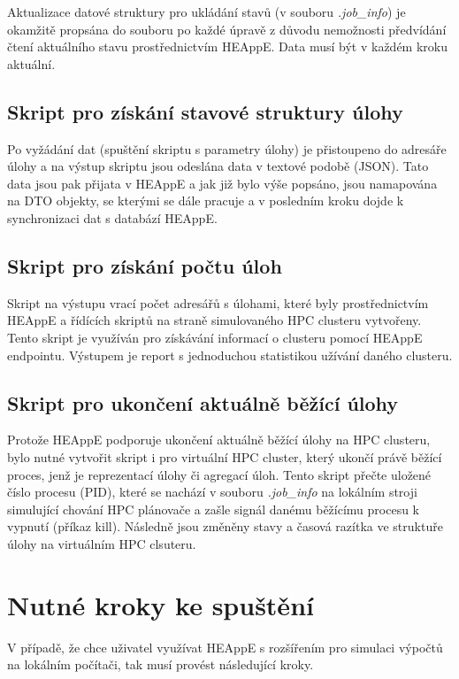 Aktualizace datové struktury pro ukládání stavů (v souboru \emph{.job\_info}) je okamžitě propsána do souboru po každé úpravě z důvodu nemožnosti předvídání čtení aktuálního stavu prostřednictvím HEAppE. Data musí být v každém kroku aktuální.

\subsection{Skript pro získání stavové struktury úlohy}
Po vyžádání dat (spuštění skriptu s parametry úlohy) je přistoupeno do adresáře úlohy a na výstup skriptu jsou odeslána data v textové podobě (JSON). Tato data jsou pak přijata v HEAppE a jak již bylo výše popsáno, jsou namapována na DTO objekty, se kterými se dále pracuje a v posledním kroku dojde k synchronizaci dat s databází HEAppE.

\subsection{Skript pro získání počtu úloh}
Skript na výstupu vrací počet adresářů s úlohami, které byly prostřednictvím HEAppE a řídících skriptů na straně simulovaného HPC clusteru vytvořeny. Tento skript je využíván pro získávání informací o clusteru pomocí HEAppE endpointu. Výstupem je report s jednoduchou statistikou užívání daného clusteru.

\subsection{Skript pro ukončení aktuálně běžící úlohy}
Protože HEAppE podporuje ukončení aktuálně běžící úlohy na HPC clusteru, bylo nutné vytvořit skript i pro virtuální HPC cluster, který ukončí právě běžící proces, jenž je reprezentací úlohy či agregací úloh. Tento skript přečte uložené číslo procesu (PID), které se nachází v souboru \emph{.job\_info} na lokálním stroji simulující chování HPC plánovače a zašle signál danému běžícímu procesu k vypnutí (příkaz kill). Následně jsou změněny stavy a časová razítka ve struktuře úlohy na virtuálním HPC clsuteru.

\section{Nutné kroky ke spuštění}
V případě, že chce uživatel využívat HEAppE s rozšířením pro simulaci výpočtů na lokálním počítači, tak musí provést následující kroky.

